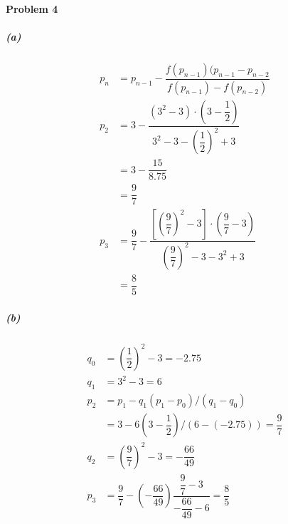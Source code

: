 \documentclass{article}
\begin{document}
\paragraph{Problem 4}
\subparagraph*{(a)}
\begin{equation}\nonumber
\begin{split}
p_{n} &= p_{n-1} - \dfrac{f(p_{n-1})(p_{n-1}-p_{n-2}}{f(p_{n-1})-f(p_{n-2})} \\
p_{2} &= 3-\dfrac{(3^2-3)\cdot(3-\dfrac{1}{2})}{3^2-3-(\dfrac{1}{2})^2+3} \\
&=3-\dfrac{15}{8.75} \\
&=\dfrac{9}{7} \\
p_{3} &= \dfrac{9}{7} - \dfrac{[(\dfrac{9}{7})^2-3]\cdot(\dfrac{9}{7}-3)}{(\dfrac{9}{7})^2-3-3^2+3} \\
&= \dfrac{8}{5}
\end{split}
\end{equation} 
\newpage
\subparagraph*{(b)}
\begin{equation}\nonumber
\begin{split}
q_{0} &= (\dfrac{1}{2})^2 - 3 = -2.75 \\
q_{1} &= 3^2 - 3 = 6 \\
p_{2} &= p_{1}-q_{1}(p_{1}-p_{0})/(q_{1}-q_{0}) \\
&= 3 - 6(3-\dfrac{1}{2})/(6-(-2.75)) = \dfrac{9}{7} \\
q_{2} &= (\dfrac{9}{7})^2 - 3 =-\dfrac{66}{49}\\
p_{3} &= \dfrac{9}{7} - (-\dfrac{66}{49})\dfrac{\dfrac{9}{7}-3}{-\dfrac{66}{49}-6} = \dfrac{8}{5}
\end{split}
\end{equation}
\end{document}
